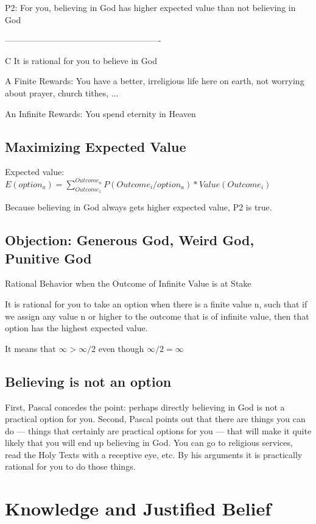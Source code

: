 \documentclass{book}
\begin{document}
P2: For you, believing in God has higher expected value than not believing in God

-------------------------------------------------------

C It is rational for you to believe in God


A Finite Rewards: You have a better, irreligious life here on earth, not worrying about prayer, church tithes, ...

An Infinite Rewards: You spend eternity in Heaven

\subsection{Maximizing Expected Value}

Expected value: $E(option_a) = \sum_{Outcome_1}^{Outcome_n} P (Outcome_i/ option_a)* Value(Outcome_i)$


Because believing in God always gets higher expected value, P2 is true.


\subsection{Objection: Generous God, Weird God, Punitive God }

Rational Behavior when the Outcome of Infinite Value is at Stake

It is rational for you to take an option when there is a finite value n, such that if we assign any value n or higher to the outcome that is of infinite value, then that option has the highest expected value.

It means that $\infty > \infty/2$ even though $\infty/2 = \infty$

\subsection{Believing is not an option}

First, Pascal concedes the point: perhaps directly believing in God is not a practical option for you. Second, Pascal points out that there are things you can do --- things that certainly are practical options for you --- that will make it quite likely that you will end up believing in God. You can go to religious services, read the Holy Texts with a receptive eye, etc. By his arguments it is practically rational for you to do those things.

\section{Knowledge and Justified Belief}
\end{document}
